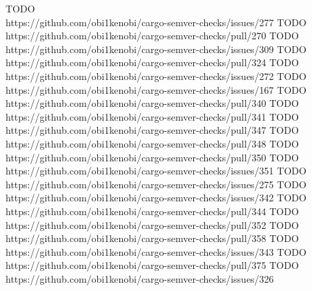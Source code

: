 \documentclass[licencjacka,en]{pracamgr}
\begin{document}
\begin{thebibliography}{99}
 TODO \\ https://github.com/obi1kenobi/cargo-semver-checks/issues/277
 TODO \\ https://github.com/obi1kenobi/cargo-semver-checks/pull/270
 TODO \\ https://github.com/obi1kenobi/cargo-semver-checks/issues/309
 TODO \\ https://github.com/obi1kenobi/cargo-semver-checks/pull/324
 TODO \\ https://github.com/obi1kenobi/cargo-semver-checks/issues/272
 TODO \\ https://github.com/obi1kenobi/cargo-semver-checks/issues/167
 TODO \\ https://github.com/obi1kenobi/cargo-semver-checks/pull/340
 TODO \\ https://github.com/obi1kenobi/cargo-semver-checks/pull/341
 TODO \\ https://github.com/obi1kenobi/cargo-semver-checks/pull/347
 TODO \\ https://github.com/obi1kenobi/cargo-semver-checks/pull/348
 TODO \\ https://github.com/obi1kenobi/cargo-semver-checks/pull/350
 TODO \\ https://github.com/obi1kenobi/cargo-semver-checks/issues/351
 TODO \\ https://github.com/obi1kenobi/cargo-semver-checks/issues/275
 TODO \\ https://github.com/obi1kenobi/cargo-semver-checks/issues/342
 TODO \\ https://github.com/obi1kenobi/cargo-semver-checks/pull/344
 TODO \\ https://github.com/obi1kenobi/cargo-semver-checks/pull/352
 TODO \\ https://github.com/obi1kenobi/cargo-semver-checks/pull/358
 TODO \\ https://github.com/obi1kenobi/cargo-semver-checks/issues/343
 TODO \\ https://github.com/obi1kenobi/cargo-semver-checks/pull/375
 TODO \\ https://github.com/obi1kenobi/cargo-semver-checks/issues/326

\end{thebibliography}
\end{document}
